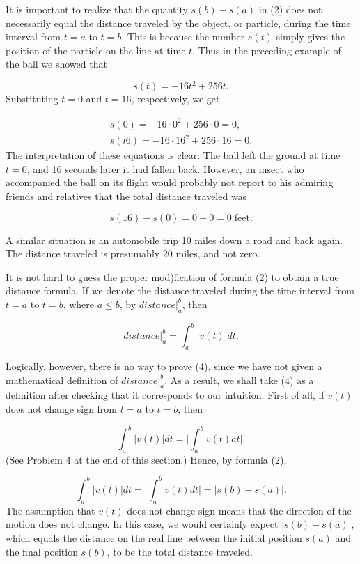 It is important to realize that the quantity $s(b) - s(a)$ in (2) does not necessarily equal the distance traveled by the object, or particle, during the time interval from $t = a$ to $t = b$. This is because the number $s(t)$ simply gives the position of the particle on the line at time $t$. Thus in the preceding example of the ball we showed that

$$
s(t) = - 16t^2 + 256t.
$$
\noindent Substituting $t = 0$ and $t = 16$, respectively, we get

$$
\begin{array}{c}
s(0) = -16 \cdot 0^2 + 256 \cdot 0 = 0, \\
s(l6) = -16 \cdot 16^2 + 256 \cdot 16 = 0.
\end{array}
$$
\noindent The interpretation of these equations is clear: The ball left the ground at time $t = 0$, and 16 seconds later it had fallen back. However, an insect who accompanied the ball on its flight would probably not report to his admiring friends and relatives that the total distance traveled was

$$
s(16) - s(0) = 0 - 0 = 0 \; \mbox{feet}.
$$

\noindent A similar situation is an automobile trip 10 miles down a road and back again. The distance traveled is presumably 20 miles, and not zero.

It is not hard to guess the proper mod)fication of formula (2) to obtain a true distance formula. If we denote the distance traveled during the time interval from $t = a$ to $t = b$, where $a \leq b$, by $distance|_{a}^{b}$, then

\begin{equation}
distance \Big|_{a}^{b} = \int_{a}^{b} | v(t) | dt.  
\label{eq4.8.4}
\end{equation}

Logically, however, there is no way to prove (4), since we have not given a mathematical definition of $distance|_{a}^{b}$. As a result, we shall take (4) as a definition after checking that it corresponds to our intuition. First of all, if $v(t)$ does not change sign from $t = a$ to $t = b$, then

$$
\int_{a}^{b} |v(t)| dt = \Big| \int_{a}^{b} v(t) at \Big|.
$$
\noindent (See Problem 4 at the end of this section.) Hence, by formula (2),

$$
\int_{a}^{b} |v(t)| dt = \Big| \int_{a}^{b} v(t) dt \Big| = | s(b) - s(a) |.
$$
\noindent The assumption that $v(t)$ does not change sign means that the direction of the motion does not change. In this case, we would certainly expect $|s(b) - s(a)|$, which equals the distance on the real line between the
initial position $s(a)$ and the final position $s(b)$, to be the total distance traveled.

